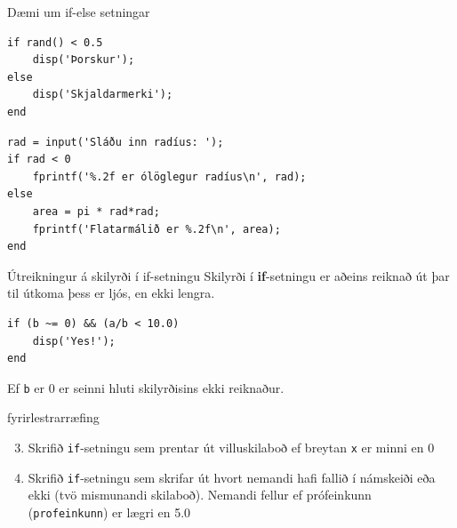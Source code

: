 \documentclass{beamer}
\begin{document}
\begin{frame}[fragile]{Dæmi um if-else setningar}
\begin{verbatim}
if rand() < 0.5
    disp('Þorskur');
else
    disp('Skjaldarmerki');
end
\end{verbatim}

\begin{verbatim}
rad = input('Sláðu inn radíus: ');
if rad < 0
    fprintf('%.2f er ólöglegur radíus\n', rad);
else
    area = pi * rad*rad;
    fprintf('Flatarmálið er %.2f\n', area);
end
\end{verbatim}
\end{frame}

\begin{frame}[fragile]{Útreikningur á skilyrði í if-setningu}
Skilyrði í \textbf{if}-setningu er aðeins reiknað út þar til útkoma þess er ljós, en ekki lengra.

\begin{verbatim}
if (b ~= 0) && (a/b < 10.0)
    disp('Yes!');
end
\end{verbatim}
Ef \texttt{b} er 0 er seinni hluti skilyrðisins ekki reiknaður.

\end{frame}

\begin{frame}{fyrirlestrarræfing}
\begin{enumerate}
\setcounter{enumi}{2}
 \item Skrifið \texttt{if}-setningu sem prentar út villuskilaboð ef breytan \texttt{x} er minni en 0
 \item Skrifið \texttt{if}-setningu sem skrifar út hvort nemandi hafi fallið í námskeiði eða ekki (tvö mismunandi skilaboð).  Nemandi fellur ef prófeinkunn (\texttt{profeinkunn}) er lægri en 5.0
\end{enumerate}

\end{frame}
\end{document}
